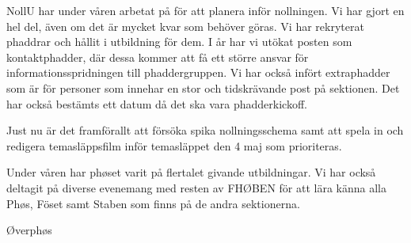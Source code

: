 \documentclass[../_main/handlingar.tex]{subfiles}
\begin{document}
NollU har under våren arbetat på för att planera inför nollningen. Vi har gjort en hel del, även om det är mycket kvar som behöver göras. Vi har rekryterat phaddrar och hållit i utbildning för dem. I år har vi utökat posten som kontaktphadder, där dessa kommer att få ett större ansvar för informationsspridningen till phaddergruppen. Vi har också infört extraphadder som är för personer som innehar en stor och tidskrävande post på sektionen. Det har också bestämts ett datum då det ska vara phadderkickoff.

Just nu är det framförallt att försöka spika nollningsschema samt att spela in och redigera temasläppsfilm inför temasläppet den 4 maj som prioriteras.

Under våren har phøset varit på flertalet givande utbildningar. Vi har också deltagit på diverse evenemang med resten av FHØBEN för att lära känna alla Phøs, Föset samt Staben som finns på de andra sektionerna.
\begin{signatures}{1}
    \mvh
    \signature{Andreas Bennström}{Øverphøs}
\end{signatures}
\end{document}
